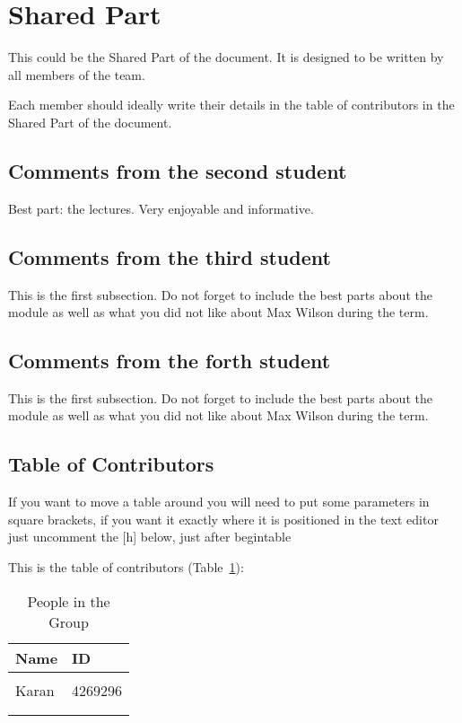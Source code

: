 \section{Shared Part}

This could be the Shared Part of the document. It is designed to be written by all members of the team.

Each member should ideally write their details in the table of contributors in the Shared Part of the document.



\subsection{Comments from the second student}
Best part: the lectures. Very enjoyable and informative. 
\subsection{Comments from the third student}
This is the first subsection. Do not forget to include the best parts about the module as well as what you did not like about Max Wilson during the term.

\subsection{Comments from the forth student}
This is the first subsection. Do not forget to include the best parts about the module as well as what you did not like about Max Wilson during the term.

\subsection{Table of Contributors}


If you want to move a table around you will need to put some parameters in square brackets, if you want it exactly where it is positioned in the text editor just uncomment the [h] below, just after begin{table}

This is the table of contributors (Table~\ref{authors}):
\begin{table}%
\centering
\caption{People in the Group}
\label{authors}
\begin{tabular}{|l|l|}
\hline
\textbf{Name} & \textbf{ID} \\
\hline
& \\
\hline
Karan&4269296 \\
\hline
& \\
\hline
& \\
\hline
\end{tabular}
\end{table}